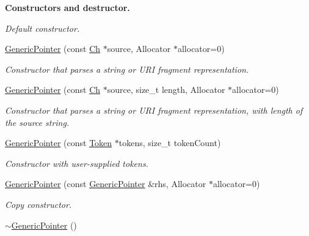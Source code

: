 \begin{Indent}{\bf Constructors and destructor.}
\begin{DoxyCompactItemize}
\begin{DoxyCompactList}\small\item\em Default constructor. \end{DoxyCompactList}\item 
\hyperlink{class_generic_pointer_a4ad549b8a826c3c2dedf03fcc07be9b0}{Generic\+Pointer} (const \hyperlink{class_generic_pointer_ab292356c11b4015c98d21b966b11f285}{Ch} $\ast$source, Allocator $\ast$allocator=0)
\begin{DoxyCompactList}\small\item\em Constructor that parses a string or U\+RI fragment representation. \end{DoxyCompactList}\item 
\hyperlink{class_generic_pointer_a9c05684ea95306aac7626e70cb3946cc}{Generic\+Pointer} (const \hyperlink{class_generic_pointer_ab292356c11b4015c98d21b966b11f285}{Ch} $\ast$source, size\+\_\+t length, Allocator $\ast$allocator=0)
\begin{DoxyCompactList}\small\item\em Constructor that parses a string or U\+RI fragment representation, with length of the source string. \end{DoxyCompactList}\item 
\hyperlink{class_generic_pointer_a524a9921eff68f389a817a20ca7f1d84}{Generic\+Pointer} (const \hyperlink{struct_generic_pointer_1_1_token}{Token} $\ast$tokens, size\+\_\+t token\+Count)
\begin{DoxyCompactList}\small\item\em Constructor with user-\/supplied tokens. \end{DoxyCompactList}\item 
\hyperlink{class_generic_pointer_a18d671bb793c6b843d5496b2b130cb70}{Generic\+Pointer} (const \hyperlink{class_generic_pointer}{Generic\+Pointer} \&rhs, Allocator $\ast$allocator=0)\hypertarget{class_generic_pointer_a18d671bb793c6b843d5496b2b130cb70}{}\label{class_generic_pointer_a18d671bb793c6b843d5496b2b130cb70}

\begin{DoxyCompactList}\small\item\em Copy constructor. \end{DoxyCompactList}\item 
\hyperlink{class_generic_pointer_acf3eb2f7c4ebf9256f638aafa17534cb}{$\sim$\+Generic\+Pointer} ()\hypertarget{class_generic_pointer_acf3eb2f7c4ebf9256f638aafa17534cb}{}\label{class_generic_pointer_acf3eb2f7c4ebf9256f638aafa17534cb}


\end{DoxyCompactItemize}
\end{Indent}
